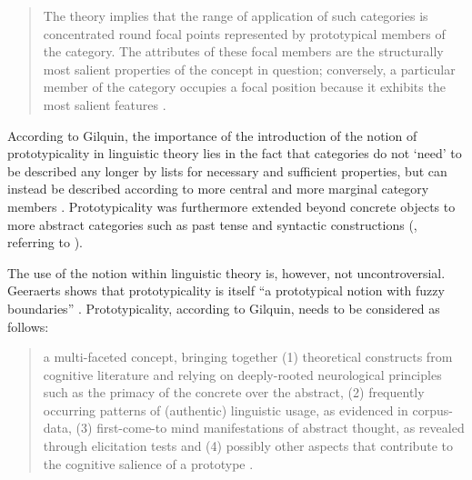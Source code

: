 \begin{quote}
The theory implies that the range of application of such categories is concentrated round focal points represented by prototypical members of the category. The attributes of these focal members are the structurally most salient properties of the concept in question; conversely, a particular member of the category occupies a focal position because it exhibits the most salient features \citep[578]{allan_lexical_2013}.
\end{quote}

According to Gilquin, the importance of the introduction of the notion of prototypicality in linguistic theory lies in the fact that categories do not ‘need’ to be described any longer by lists for necessary and sufficient properties, but can instead be described according to more central and more marginal category members \citep[160--161]{gilquin_place_2006}. Prototypicality was furthermore extended beyond concrete objects to more abstract categories such as past tense and syntactic constructions (\citealt{gilquin_place_2006}, referring to \citealt{taylor_linguistic_1989}).

The use of the notion within linguistic theory is, however, not uncontroversial. Geeraerts shows that prototypicality is itself “a prototypical notion with fuzzy boundaries” \citep{Geeraerts2006}. Prototypicality, according to Gilquin, needs to be considered as follows:

\begin{quote}
a multi-faceted concept, bringing together (1) theoretical constructs from cognitive literature and relying on deeply-rooted neurological principles such as the primacy of the concrete over the abstract, (2) frequently occurring patterns of (authentic) linguistic usage, as evidenced in corpus-data, (3) first-come-to mind manifestations of abstract thought, as revealed through elicitation tests and (4) possibly other aspects that contribute to the cognitive salience of a prototype \citep[180]{gilquin_place_2006}.
\end{quote}

